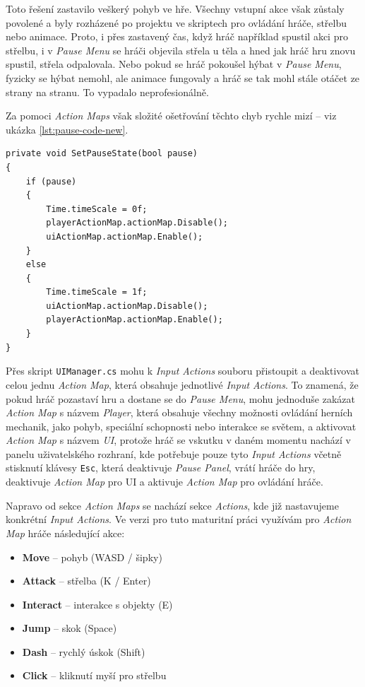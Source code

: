 Toto řešení zastavilo veškerý pohyb ve hře. Všechny vstupní akce však zůstaly povolené a byly rozházené po projektu ve skriptech pro ovládání hráče, střelbu nebo animace. Proto, i přes zastavený čas, když hráč například spustil akci pro střelbu, i v \emph{Pause Menu} se hráči objevila střela u těla a hned jak hráč hru znovu spustil, střela odpalovala. Nebo pokud se hráč pokoušel hýbat v \emph{Pause Menu}, fyzicky se hýbat nemohl, ale animace fungovaly a hráč se tak mohl stále otáčet ze strany na stranu. To vypadalo neprofesionálně.

Za pomoci \emph{Action Maps} však složité ošetřování těchto chyb rychle mizí – viz ukázka \ref{lst:pause-code-new}.

\begin{lstlisting}[caption={Moderní řešení pozastavení pomocí Input System}, label={lst:pause-code-new}]
private void SetPauseState(bool pause)
{
    if (pause)
    {
        Time.timeScale = 0f;
        playerActionMap.actionMap.Disable();
        uiActionMap.actionMap.Enable();
    }
    else
    {
        Time.timeScale = 1f;
        uiActionMap.actionMap.Disable();
        playerActionMap.actionMap.Enable();
    }
}
\end{lstlisting}

Přes skript \texttt{UIManager.cs} mohu k \emph{Input Actions} souboru přistoupit a deaktivovat celou jednu \emph{Action Map}, která obsahuje jednotlivé \emph{Input Actions}. To znamená, že pokud hráč pozastaví hru a dostane se do \emph{Pause Menu}, mohu jednoduše zakázat \emph{Action Map} s názvem \emph{Player}, která obsahuje všechny možnosti ovládání herních mechanik, jako pohyb, speciální schopnosti nebo interakce se světem, a aktivovat \emph{Action Map} s názvem \emph{UI}, protože hráč se vskutku v daném momentu nachází v panelu uživatelského rozhraní, kde potřebuje pouze tyto \emph{Input Actions} včetně stisknutí klávesy \texttt{Esc}, která deaktivuje \emph{Pause Panel}, vrátí hráče do hry, deaktivuje \emph{Action Map} pro UI a aktivuje \emph{Action Map} pro ovládání hráče.

Napravo od sekce \emph{Action Maps} se nachází sekce \emph{Actions}, kde již nastavujeme konkrétní \emph{Input Actions}. Ve verzi pro tuto maturitní práci využívám pro \emph{Action Map} hráče následující akce:

\begin{itemize}
    \item \textbf{Move} -- pohyb (WASD / šipky)
    \item \textbf{Attack} -- střelba (K / Enter)
    \item \textbf{Interact} -- interakce s objekty (E)
    \item \textbf{Jump} -- skok (Space)
    \item \textbf{Dash} -- rychlý úskok (Shift)
    \item \textbf{Click} -- kliknutí myší pro střelbu
\end{itemize}

